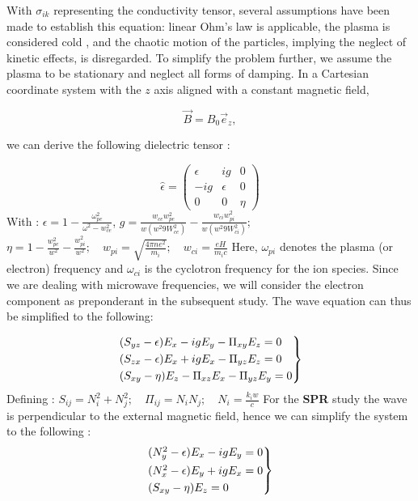 \documentclass[11pt,openany]{report}
\begin{document}
\begin{multicols}{2}
    With $\sigma_{ik}$ representing the conductivity tensor, several assumptions have been made to establish this equation: linear Ohm's law is applicable, the plasma is considered cold \cite{Krutkin_thesis}, and the chaotic motion of the particles, implying the neglect of kinetic effects, is disregarded. To simplify the problem further, we assume the plasma to be stationary and neglect all forms of damping. In a Cartesian coordinate system with the $z$ axis aligned with a constant magnetic field,

    $$\vec{B} = B_0 \vec{e}_z,$$

    we can derive the following dielectric tensor \cite{Thomas H. Stix}:

    $$
        \hat{\epsilon} = \begin{pmatrix}
            \epsilon & ig       & 0    \\
            -ig      & \epsilon & 0    \\
            0        & 0        & \eta
        \end{pmatrix}
    $$
    With : $\epsilon = 1 - \frac{\omega_{pe}^2}{\omega^2 - w_{ce}^2}$, $g = \frac{w_{ce}w_{pe}^2}{w(w^2 9 W_{ce}^2)} - \frac{w_{ci}w_{pi}^2}{w(w^2 9 W_{ci}^2)}$;
    $ \eta  = 1 - \frac{w_{pe}^2}{w^2} -  \frac{w_{pi}^2}{w^2}; \quad w_{pi} = \sqrt{\frac{4\pi n e^2}{m_i}}; \quad w_{ci} = \frac{eH}{m_i c}$
    Here, $\omega_{pi}$ denotes the plasma (or electron) frequency and $\omega_{ci}$ is the cyclotron frequency for the ion species. Since we are dealing with microwave frequencies, we will consider the electron component as preponderant in the subsequent study. The wave equation can thus be simplified to the following:

    \begin{equation}
        \begin{rcases}
            (S_{yz} - \epsilon)E_x - igE_y - \Pi_{xy}E_z = 0 \\
            (S_{zx} - \epsilon)E_x + igE_x - \Pi_{yz}E_z = 0 \\
            (S_{xy} - \eta)E_z -\Pi_{xz}E_x - \Pi_{yz}E_y = 0
        \end{rcases}
    \end{equation}
    Defining : $S_{ij} = N_i^2 + N_j^2; \quad \Pi_{ij} = N_iN_j ; \quad N_{i} = \frac{k_iw}{c}$
    For the \textbf{SPR} study the wave is perpendicular to the external magnetic field, hence we can simplify the system to the following :
    \begin{equation}
        \begin{rcases}
            (N_y^2 - \epsilon)E_x - igE_y = 0 \\
            (N_x^2 - \epsilon)E_y + igE_x = 0 \\
            (S_{xy} - \eta)E_z = 0
        \end{rcases}
    \end{equation}


\end{multicols}
\end{document}
